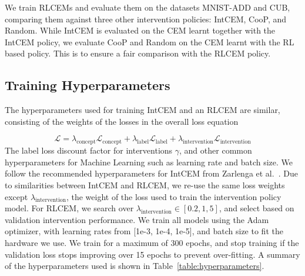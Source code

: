 We train RLCEMs and evaluate them on the datasets MNIST-ADD and CUB, 
comparing them against three other intervention policies:
IntCEM, CooP, and Random. While IntCEM is evaluated on the
CEM learnt together with the IntCEM policy,
we evaluate CooP and Random on the CEM learnt 
with the RL based policy. This is to ensure a fair comparison
with the RLCEM policy.

\subsection{Training Hyperparameters}

The hyperparameters used for training IntCEM and an RLCEM are similar,
consisting of the weights of the losses in the overall loss equation

\[\mathcal{L} = \lambda_{\text{concept}} \mathcal{L}_{\text{concept}}
+  \lambda_{\text{label}} \mathcal{L}_{\text{label}}
+  \lambda_{\text{intervention}} \mathcal{L}_{\text{intervention}}\]
The label loss discount factor for interventions $\gamma$,
and other common hyperparameters for Machine Learning such as learning rate
and batch size.
We follow the recommended hyperparameters 
for IntCEM from Zarlenga et al.~\cite{intcem}. 
Due 
to similarities between IntCEM and RLCEM, we re-use
the same loss weights except $\lambda_{\text{intervention}}$,
the weight of the loss used to train the intervention policy model.
For RLCEM, we search over $\lambda_{\text{intervention}} \in [0.2, 1, 5]$, and select based on validation
intervention performance.
We train all models using the Adam~\cite{adam} optimizer, with learning rates
from [1e-3, 1e-4, 1e-5], and 
batch size to fit the hardware we use.
We train for a maximum of 300 epochs,
and stop training if the validation loss stops improving over 15 epochs
to prevent over-fitting.
A summary of the hyperparameters used is shown in 
Table~\ref{table:hyperparameters}.

